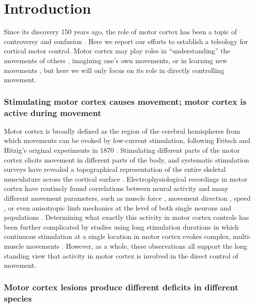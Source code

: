 \section{Introduction}

Since its discovery 150 years ago, the role of motor cortex has been a topic of controversy and confusion \cite{Tyler2000,Gross2007,Lashley1924,DeBarenne1933}. Here we report our efforts to establish a teleology for cortical motor control. Motor cortex may play roles in ``understanding'' the movements of others \cite{Rizzolatti2004}, imagining one's own movements, or in learning new movements \cite{Kawai2015}, but here we will only focus on its role in directly controlling movement.

\subsubsection*{Stimulating motor cortex causes movement; motor cortex is active during movement}

Motor cortex is broadly defined as the region of the cerebral hemispheres from which movements can be evoked by low-current stimulation, following Fritsch and Hitzig's original experiments in 1870 \cite{Fritsch1870}. Stimulating different parts of the motor cortex elicits movement in different parts of the body, and systematic stimulation surveys have revealed a topographical representation of the entire skeletal musculature across the cortical surface \cite{Leyton1917, Penfield1937, Neafsey1986}. Electrophysiological recordings in motor cortex have routinely found correlations between neural activity and many different movement parameters, such as muscle force \cite{Evarts1968}, movement direction \cite{Georgopoulos1986}, speed \cite{Schwartz1993}, or even anisotropic limb mechanics \cite{Scott2001} at the level of both single neurons \cite{Evarts1968,Churchland2007} and populations \cite{Georgopoulos1986,Churchland2012}. Determining what exactly this activity in motor cortex controls \cite{Todorov2000} has been further complicated by studies using long stimulation durations in which continuous stimulation at a single location in motor cortex evokes complex, multi-muscle movements \cite{Graziano2002,Aflalo2006}. However, as a whole, these observations all support the long standing view that activity in motor cortex is involved in the direct control of movement.

\subsubsection*{Motor cortex lesions produce different deficits in different species}

